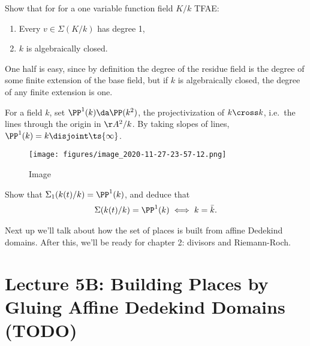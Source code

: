 \begin{exercise}[?]

Show that for for a one variable function field \(K/k\) TFAE:

\begin{enumerate}
\def\labelenumi{\arabic{enumi}.}
\item
  Every \(v\in \Sigma(K/k)\) has degree 1,
\item
  \(k\) is algebraically closed.
\end{enumerate}

\end{exercise}

\begin{remark}

One half is easy, since by definition the degree of the residue field is
the degree of some finite extension of the base field, but if \(k\) is
algebraically closed, the degree of any finite extension is one.

\end{remark}

\begin{exercise}[?]

For a field \(k\), set \(\PP^1(k) \da \PP(k^2)\), the projectivization
of \(k\cross k\), i.e.~the lines through the origin in \(\AA^2/k\). By
taking slopes of lines, \(\PP^1(k) = k \disjoint \ts{\infty}\).

\begin{figure}
\centering
\texttt{[image: figures/image\_2020-11-27-23-57-12.png]}
\caption{Image}
\end{figure}

Show that \(\Sigma_1(k(t)/k) = \PP^1(k)\), and deduce that
\begin{align*}  
\Sigma(k(t)/k) = \PP^1(k) \iff k = \bar k
.\end{align*}

\end{exercise}

Next up we'll talk about how the set of places is built from affine
Dedekind domains. After this, we'll be ready for chapter 2: divisors and
Riemann-Roch.

\hypertarget{lecture-5b-building-places-by-gluing-affine-dedekind-domains-todo}{%
\section{Lecture 5B: Building Places by Gluing Affine Dedekind Domains
(TODO)}\label{lecture-5b-building-places-by-gluing-affine-dedekind-domains-todo}}


